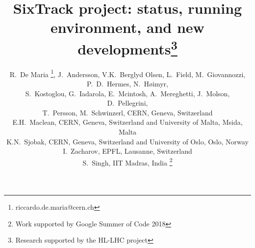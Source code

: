 \documentclass[a4paper,
              ]{jacow}
\begin{document}
\title{SixTrack project: status, running environment, and new developments\thanks{Research supported by the HL-LHC project}}

\author{
R.~De Maria \thanks{riccardo.de.maria@cern.ch},
J.~Andersson,
V.K.~Berglyd Olsen,
L.~Field,
M.~Giovannozzi,
P.~D.~Hermes,
N.~H\o imyr, \\
S.~Kostoglou,
G.~Iadarola,
E.~Mcintosh,
A.~Mereghetti,
J.~Molson,
D.~Pellegrini,\\
T.~Persson,
M.~Schwinzerl,
CERN, Geneva, Switzerland \\
E.H.~Maclean, CERN, Geneva, Switzerland and University of Malta, Msida, Malta\\
K.N.~Sjobak, CERN, Geneva, Switzerland and University of Oslo, Oslo, Norway\\
I.~Zacharov, EPFL, Lausanne, Switzerland \\
S.~Singh, IIT Madras, India \thanks{Work supported by Google Summer of Code 2018}
}
\maketitle

\end{document}
